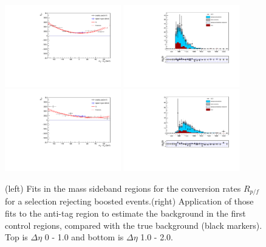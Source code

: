 \begin{figure}[h]
\centering
\includegraphics[width=0.45\textwidth]{F5/HH4b2p1SR_Fit_BG_boost_dEta0_MCSR.pdf}
\includegraphics[width=0.45\textwidth]{F5/HH4b2p1_Plot_BG_boost_dEta0_MCSR.pdf}\\
\includegraphics[width=0.45\textwidth]{F5/HH4b2p1SR_Fit_BG_boost_dEta1_MCSR.pdf}
\includegraphics[width=0.45\textwidth]{F5/HH4b2p1_Plot_BG_boost_dEta1_MCSR.pdf}
\caption{(left) Fits in the mass sideband regions for the conversion rates $R_{p/f}$ for a selection rejecting boosted events.(right) Application of those fits to the anti-tag region to estimate the background in the first control regions, compared with the true background (black markers). Top is $\Delta\eta$ 0 - 1.0 and bottom is $\Delta\eta$ 1.0 - 2.0.}
\label{fig:closureMC1}
\end{figure}

